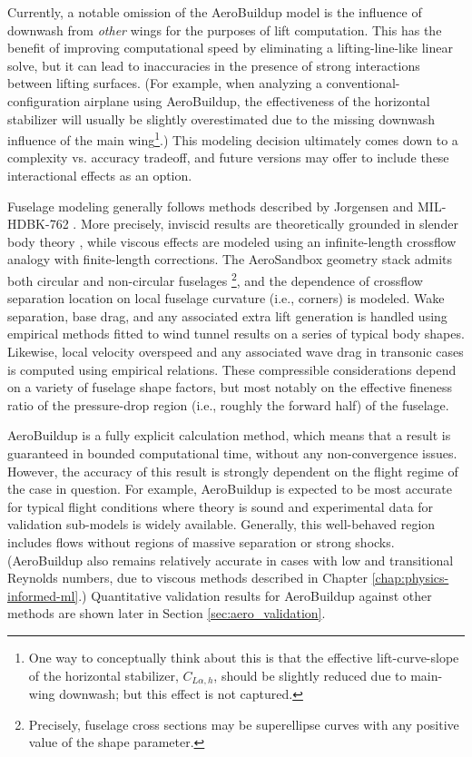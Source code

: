 Currently, a notable omission of the AeroBuildup model is the influence of downwash from \emph{other} wings for the purposes of lift computation. This has the benefit of improving computational speed by eliminating a lifting-line-like linear solve, but it can lead to inaccuracies in the presence of strong interactions between lifting surfaces. (For example, when analyzing a conventional-configuration airplane using AeroBuildup, the effectiveness of the horizontal stabilizer will usually be slightly overestimated due to the missing downwash influence of the main wing\footnote{One way to conceptually think about this is that the effective lift-curve-slope of the horizontal stabilizer, $C_{L\alpha, h}$, should be slightly reduced due to main-wing downwash; but this effect is not captured.}.) This modeling decision ultimately comes down to a complexity vs. accuracy tradeoff, and future versions may offer to include these interactional effects as an option.

Fuselage modeling generally follows methods described by Jorgensen \cite{jorgensen_method_1973, jorgensen_prediction_1979} and MIL-HDBK-762 \cite{_design_1990}. More precisely, inviscid results are theoretically grounded in slender body theory \cite{drela_flight_2013}, while viscous effects are modeled using an infinite-length crossflow analogy with finite-length corrections. The AeroSandbox geometry stack admits both circular and non-circular fuselages \footnote{Precisely, fuselage cross sections may be superellipse curves with any positive value of the shape parameter.}, and the dependence of crossflow separation location on local fuselage curvature (i.e., corners) is modeled. Wake separation, base drag, and any associated extra lift generation is handled using empirical methods fitted to wind tunnel results on a series of typical body shapes. Likewise, local velocity overspeed and any associated wave drag in transonic cases is computed using empirical relations. These compressible considerations depend on a variety of fuselage shape factors, but most notably on the effective fineness ratio of the pressure-drop region (i.e., roughly the forward half) of the fuselage.

AeroBuildup is a fully explicit calculation method, which means that a result is guaranteed in bounded computational time, without any non-convergence issues. However, the accuracy of this result is strongly dependent on the flight regime of the case in question. For example, AeroBuildup is expected to be most accurate for typical flight conditions where theory is sound and experimental data for validation sub-models is widely available. Generally, this well-behaved region includes flows without regions of massive separation or strong shocks. (AeroBuildup also remains relatively accurate in cases with low and transitional Reynolds numbers, due to viscous methods described in Chapter \ref{chap:physics-informed-ml}.) Quantitative validation results for AeroBuildup against other methods are shown later in Section \ref{sec:aero_validation}.

